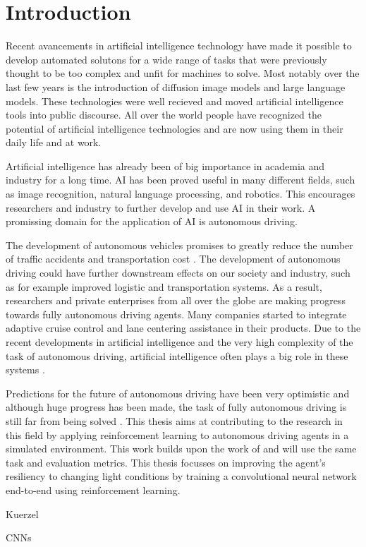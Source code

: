 \chapter{Introduction}
\label{cha:Introduction}

Recent avancements in artificial intelligence technology have made it possible to develop automated solutons for a wide range of tasks that were previously thought to be too complex and unfit for machines to solve. Most notably over the last few years is the introduction of diffusion image models and large language models. These technologies were well recieved and moved artificial intelligence tools into public discourse. All over the world people have recognized the potential of artificial intelligence technologies and are now using them in their daily life and at work.

Artificial intelligence has already been of big importance in academia and industry for a long time. AI has been proved useful in many different fields, such as image recognition, natural language processing, and robotics. This encourages researchers and industry to further develop and use AI in their work. A promissing domain for the application of AI is autonomous driving.

The development of autonomous vehicles promises to greatly reduce the number of traffic accidents and transportation cost \textcite{mckinsey}. The development of autonomous driving could have further downstream effects on our society and industry, such as for example improved logistic and transportation systems.
As a result, researchers and private enterprises from all over the globe are making progress towards fully autonomous driving agents. Many companies started to integrate adaptive cruise control and lane centering assistance \textcite{carreviews} in their products. Due to the recent developments in artificial intelligence and the very high complexity of the task of autonomous driving, artificial intelligence often plays a big role in these systems \textcite{drl_for_ad}.

Predictions for the future of autonomous driving have been very optimistic and although huge progress has been made, the task of fully autonomous driving is still far from being solved \textcite{state_of_autonomous_driving2023}. This thesis aims at contributing to the research in this field by applying reinforcement learning to autonomous driving agents in a simulated environment. This work builds upon the work of \textcite{maximilian} and will use the same task and evaluation metrics. This thesis focusses on improving the agent's resiliency to changing light conditions by training a convolutional neural network end-to-end using reinforcement learning.



\ac{Kuerzel}

\acp{CNN}